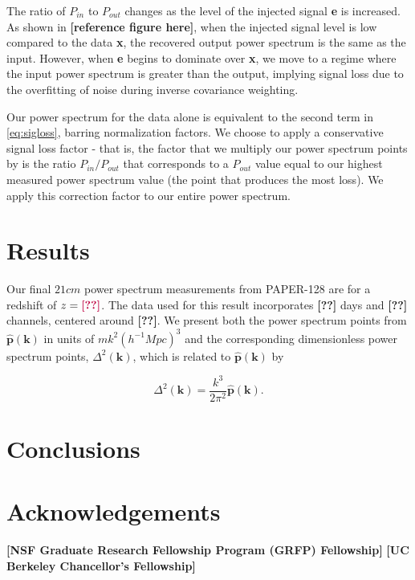 \documentclass[preprint2,numberedappendix,tighten,twocolappendix]{aastex6}  %
\newcommand{\cc}[1]{{\color{purple} \textbf{[#1]}}}
\begin{document}
The ratio of $P_{in}$ to $P_{out}$ changes as the level of the injected signal \textbf{e} is increased. As shown in \cc{reference figure here}, when the injected signal level is low compared to the data \textbf{x}, the recovered output power spectrum is the same as the input. However, when \textbf{e} begins to dominate over  \textbf{x}, we move to a regime where the input power spectrum is greater than the output, implying signal loss due to the overfitting of noise during inverse covariance weighting. 

Our power spectrum for the data alone is equivalent to the second term in \eqref{eq:sigloss}, barring normalization factors. We choose to apply a conservative signal loss factor - that is, the factor that we multiply our power spectrum points by is the ratio $P_{in}/P_{out}$ that corresponds to a $P_{out}$ value equal to our highest measured power spectrum value (the point that produces the most loss). We apply this correction factor to our entire power spectrum.

\section{Results}
\label{sec:Res}

Our final $21 cm$ power spectrum measurements from PAPER-128 are for a redshift of $z=\cc{??}$. The data used for this result incorporates \cc{??} days and \cc{??} channels, centered around \cc{??}. We present both the power spectrum points from $\hat{\textbf{p}}(\textbf{k})$ in units of $mk^{2}(h^{-1}Mpc)^{3}$ and the corresponding dimensionless power spectrum points, $\Delta^{2}(\textbf{k})$, which is related to $\hat{\textbf{p}}(\textbf{k})$ by

\begin{equation}
\label{eq:deltasq}
\Delta^{2}(\textbf{k}) = \frac{k^{3}}{2\pi^{2}}\hat{\textbf{p}}(\textbf{k}).
\end{equation}

\section{Conclusions}
\label{sec:Con}

\section{Acknowledgements}
\cc{NSF Graduate Research Fellowship Program (GRFP) Fellowship}
\cc{UC Berkeley Chancellor's Fellowship}
\label{sec:Ack}



\end{document}
